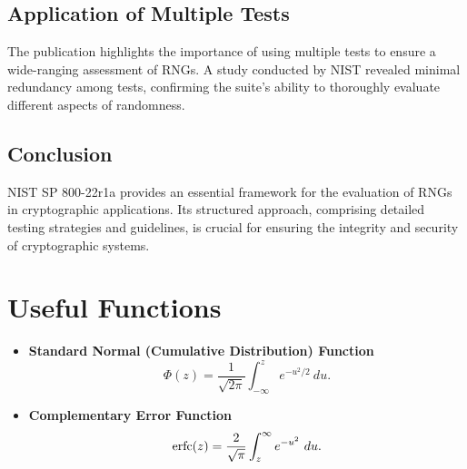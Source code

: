 \documentclass[12pt,openany]{book}
\theoremstyle{definition}
\begin{document}
	\subsection{Application of Multiple Tests}
	The publication highlights the importance of using multiple tests to ensure a wide-ranging assessment of RNGs. A study conducted by NIST revealed minimal redundancy among tests, confirming the suite's ability to thoroughly evaluate different aspects of randomness.
	
	\subsection{Conclusion}
	NIST SP 800-22r1a provides an essential framework for the evaluation of RNGs in cryptographic applications. Its structured approach, comprising detailed testing strategies and guidelines, is crucial for ensuring the integrity and security of cryptographic systems.
	
	\section{Useful Functions}
	
	\begin{itemize}
		\item \textbf{Standard Normal (Cumulative Distribution) Function}
		\[
		\Phi(z)=\frac{1}{\sqrt{2\pi}}\int_{-\infty}^ze^{-u^2/2}\ du.
		\]
		\item \textbf{Complementary Error Function}
		\[
		\textnormal{erfc}(z)=\frac{2}{\sqrt{\pi}}\int_{z}^{\infty}e^{-u^2}\ du.
		\]
	\end{itemize}
\end{document}
